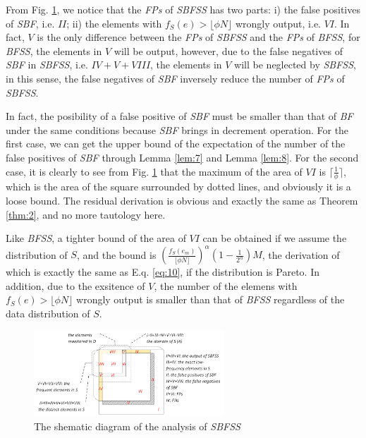 \documentclass[conference]{IEEEtran}
\begin{document}
\begin{IEEEproof}
From Fig. \ref{fig:sbfss}, we notice that the \emph{FPs} of \emph{SBFSS} has two parts: i) the false positives of \emph{SBF}, i.e. $II$; ii) the elements with $f_S(e)>\lfloor\phi N\rfloor$ wrongly output, i.e. $VI$. In fact, $V$ is the only difference between the \emph{FPs} of \emph{SBFSS} and the \emph{FPs} of \emph{BFSS}, for \emph{BFSS}, the elements in $V$ will be output, however, due to the false negatives of \emph{SBF} in \emph{SBFSS}, i.e. $IV+V+VIII$, the elements in $V$ will be neglected by \emph{SBFSS}, in this sense, the false negatives of \emph{SBF} inversely reduce the number of \emph{FPs} of \emph{SBFSS}. \par
In fact, the posibility of a false positive of \emph{SBF} must be smaller than that of \emph{BF} under the same conditions because \emph{SBF} brings in decrement operation. For the first case, we can get the upper bound of the expectation of the number of the false positives of \emph{SBF} through Lemma \ref{lem:7} and Lemma \ref{lem:8}. For the second case, it is clearly to see from Fig. \ref{fig:sbfss} that the maximum of the area of $VI$ is $\lceil\frac{1}{\phi}\rceil$, which is the area of the square surrounded by dotted lines, and obviously it is a loose bound. The residual derivation is obvious and exactly the same as Theorem \ref{thm:2}, and no more tautology here.
\end{IEEEproof}
Like \emph{BFSS}, a tighter bound of the area of $VI$ can be obtained if we assume the distribution of $S$, and the bound is $(\frac{f_S(e_m)}{\lfloor \phi N\rfloor})^\alpha(1-\frac{1}{2^\alpha})M$, the derivation of which is exactly the same as E.q. \ref{eq:10}, if the distribution is Pareto. In addition, due to the exsitence of $V$, the number of the elemens with $f_S(e)>\lfloor\phi N\rfloor$ wrongly output is smaller than that of \emph{BFSS} regardless of the data distribution of $S$. 
\begin{figure}
	\centering
	\includegraphics[width=2.8in]{png/sbfss.png}
	\caption{The shematic diagram of the analysis of \emph{SBFSS}}
	\label{fig:sbfss}
\end{figure}
\end{document}
